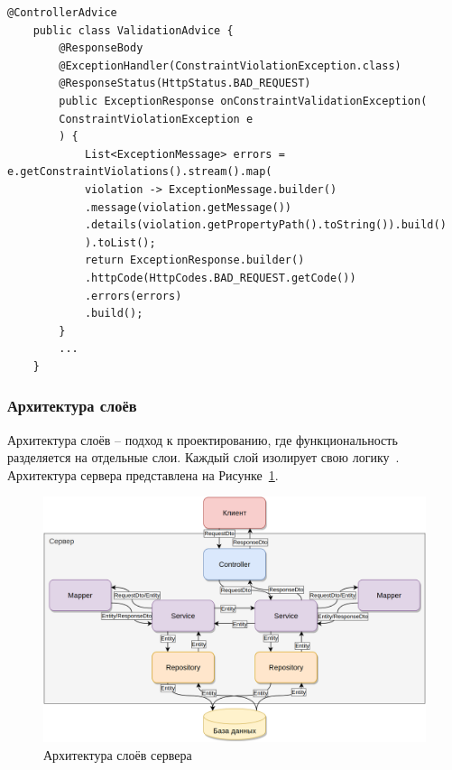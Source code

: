 \documentclass[a4paper,article]{article}
\begin{document}
\begin{sloppypar}
    \newpage

    \begin{lstlisting}[label=validationadvice,caption=Класс-прехватчик ошибок Spring]
    @ControllerAdvice
    public class ValidationAdvice {
        @ResponseBody
        @ExceptionHandler(ConstraintViolationException.class)
        @ResponseStatus(HttpStatus.BAD_REQUEST)
        public ExceptionResponse onConstraintValidationException(
        ConstraintViolationException e
        ) {
            List<ExceptionMessage> errors = e.getConstraintViolations().stream().map(
            violation -> ExceptionMessage.builder()
            .message(violation.getMessage())
            .details(violation.getPropertyPath().toString()).build()
            ).toList();
            return ExceptionResponse.builder()
            .httpCode(HttpCodes.BAD_REQUEST.getCode())
            .errors(errors)
            .build();
        }
        ...
    }
    \end{lstlisting}

    \subsubsection{Архитектура слоёв}\label{Реализация. Сервер. Архитектура слоёв}

    Архитектура слоёв -- подход к проектированию, где функциональность разделяется на отдельные слои. Каждый слой изолирует свою логику~\cite{baeldungbook, springguide, cleanarch}. Архитектура сервера представлена на Рисунке~\ref{fig:Схема работы сервера}.

    \begin{figure}[h]
        \centering
        \includegraphics[width=0.9\linewidth]{Схема работы сервера.png}
        \caption{\centering Архитектура слоёв сервера}
        \label{fig:Схема работы сервера}
    \end{figure}


\end{sloppypar}
\end{document}
